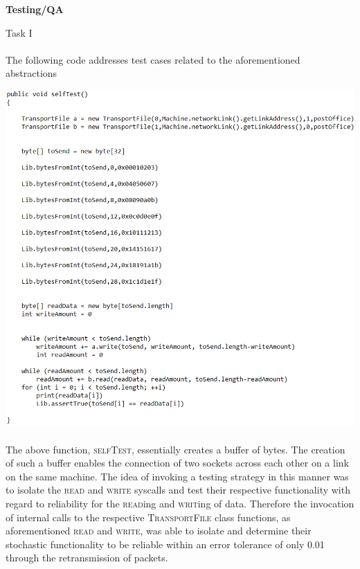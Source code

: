 \documentclass[12pt]{article}
\begin{document}
{\setlength{\parindent}{0cm}
\textbf{Testing/QA}\\
\begin{center}
Task I
\end{center}
\paragraph{} The following code addresses test cases related to the aforementioned abstractions
\begin{center} \includegraphics[width=150mm]{testCase1.png} \end{center}
\paragraph{} The above function, \textsc{selfTest}, essentially creates a buffer of bytes.
    The creation of such a buffer enables the connection of two sockets across each other on a link on the same machine.
    The idea of invoking a testing strategy in this manner was to isolate the \textsc{read} and \textsc{write} syscalls and test their respective functionality with regard to reliability for 
    the \textsc{read}ing and \textsc{writ}ing of data. Therefore the invocation of internal calls to the respective \textsc{TransportFile} class functions, as aforementioned \textsc{read} and \textsc{write},
    was able to isolate and determine their stochastic functionality to be reliable within an error tolerance of only 0.01 through the retransmission of packets.
}
\end{document}
